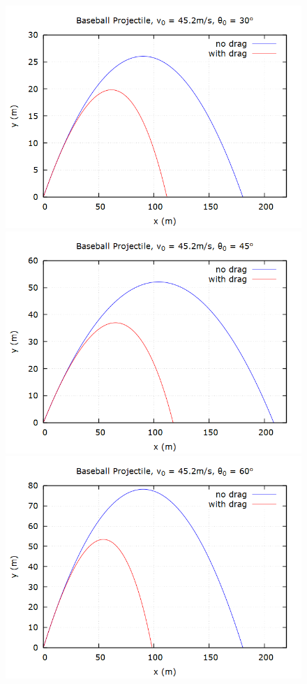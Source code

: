 \documentclass[aps,prl,twocolumn,superscriptaddress]{revtex4-1}
\begin{document}
\begin{figure}[htbp]
  	\begin{center}
 		\includegraphics[scale=0.3]{proj30.png}
 		\includegraphics[scale=0.3]{proj45.png}
 		\includegraphics[scale=0.3]{proj60.png}

\end{center}
\end{figure}
\end{document}
